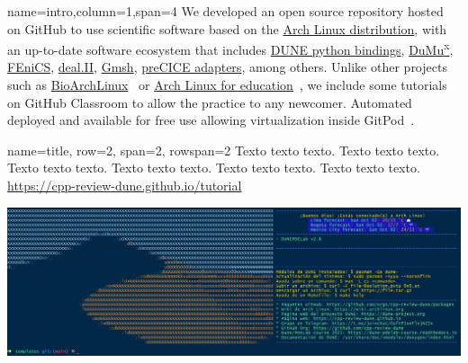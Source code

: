 \documentclass[
	paper=a0,
	style=ruled, %
	]{bfhsciposter}
\begin{document}
\begin{tcbposter}[
		poster={
				columns=4,
				rows=7,
				spacing=1cm,
			},]

	\begin{posterboxenv}[,BFH-abstract,title=Abstract]{name=intro,column=1,span=4}
		We developed an open source repository hosted on GitHub to use
		scientific software based on the \href{https://archlinux.org}{Arch Linux distribution},
		with an up-to-date software ecosystem that includes
		\href{https://dune-project.org/doc/gettingstarted}{DUNE python bindings},
		\href{https://dumux.org}{DuMu\textsuperscript{x}},
		\href{https://fenicsproject.org}{FEniCS},
		\href{https://www.dealii.org}{deal.II},
		\href{https://gmsh.info}{Gmsh},
		\href{https://precice.org/adapters-overview.html}{preCICE adapters},
		among others.
		Unlike other projects such as
		\href{https://github.com/BioArchLinux}{BioArchLinux}~\cite{bioarchlinux_2022}
		or \href{https://github.com/arch4edu}{Arch Linux for education}~\cite{arch4edu2019},
		we include some tutorials on GitHub Classroom to allow the practice
		to any newcomer.
		Automated deployed and available for free use allowing virtualization inside
		GitPod~\cite{gitpod_2022}.
	\end{posterboxenv}

	\begin{posterboxenv}[BFH-framed, title=C++ Review DUNE]{name=title, row=2, span=2, rowspan=2}
		Texto texto texto. Texto texto texto. Texto texto texto. Texto texto texto. Texto texto texto. Texto texto texto.
		\url{https://cpp-review-dune.github.io/tutorial}

		\includegraphics[width=\linewidth]{splash}
	\end{posterboxenv}


\end{tcbposter}
\end{document}
